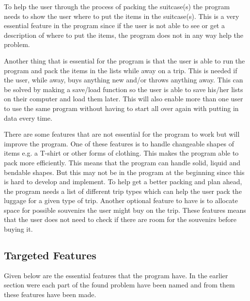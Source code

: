 To help the user through the process of packing the suitcase(s) the program needs to show the user where to put the items in the suitcase(s). This is a very essential feature in the program since if the user is not able to see or get a description of where to put the items, the program does not in any way help the problem.

Another thing that is essential for the program is that the user is able to run the program and pack the items in the lists while away on a trip. This is needed if the user, while away, buys anything new and/or throws anything away. This can be solved by making a save/load function so the user is able to save his/her lists on their computer and load them later. This will also enable more than one user to use the same program without having to start all over again with putting in data every time.

There are some features that are not essential for the program to work but will improve the program. 
One of these features is to handle changeable shapes of items e.g. a T-shirt or other forms of clothing. This makes the program able to pack more efficiently. This means that the program can handle solid, liquid and bendable shapes. But this may not be in the program at the beginning since this is hard to develop and implement.
To help get a better packing and plan ahead, the program needs a list of different trip types which can help the user pack the luggage for a given type of trip.
Another optional feature to have is to allocate space for possible souvenirs the user might buy on the trip. These features means that the user does not need to check if there are room for the souvenirs before buying it.

\subsection{Targeted Features}
Given below are the essential features that the program have. In the earlier section were each part of the found problem have been named and from them these features have been made.\newline

